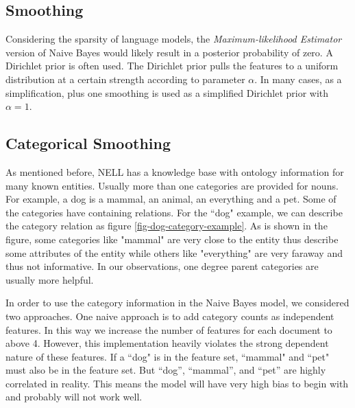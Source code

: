 \subsection{Smoothing}

Considering the sparsity of language models, the \emph{Maximum-likelihood Estimator} version of Naive Bayes would likely result in a posterior probability of zero. A Dirichlet prior is often used. The Dirichlet prior pulls the features to a uniform distribution at a certain strength according to parameter $\alpha$. In many cases, as a simplification, plus one smoothing is used as a simplified Dirichlet prior with $\alpha=1$.

\subsection{Categorical Smoothing}

As mentioned before, NELL has a knowledge base with ontology information for many known entities. Usually more than one categories are provided for nouns. For example, a dog is a mammal, an animal, an everything and a pet. Some of the categories have containing relations. For the ``dog" example, we can describe the category relation as figure \ref{fig-dog-category-example}. As is shown in the figure, some categories like "mammal" are very close to the entity thus describe some attributes of the entity while others like "everything" are very faraway and thus not informative. In our observations, one degree parent categories are usually more helpful.


In order to use the category information in the Naive Bayes model, we considered two approaches. One naive approach is to add category counts as independent features. In this way we increase the number of features for each document to above 4. However, this implementation heavily violates the strong dependent nature of these features. If a ``dog" is in the feature set, ``mammal" and ``pet" must also be in the feature set. But ``dog'', ``mammal'', and ``pet'' are highly correlated in reality. This means the model will have very high bias to begin with and probably will not work well.

